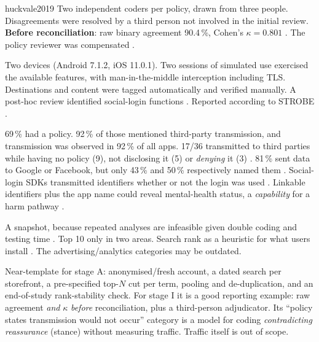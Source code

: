 \begin{papercard}{huckvale2019}
 Two independent coders per policy, drawn from three people. Disagreements were resolved by a third person not involved in the initial review. \textbf{Before reconciliation}: raw binary agreement 90.4\,\%, Cohen's $\kappa=0.801$ . The policy reviewer was compensated .

 Two devices (Android 7.1.2, iOS 11.0.1). Two sessions of simulated use exercised the available features, with man-in-the-middle interception including TLS. Destinations and content were tagged automatically and verified manually. A post-hoc review identified social-login functions . Reported according to STROBE .

 69\,\% had a policy. 92\,\% of those mentioned third-party transmission, and transmission was observed in 92\,\% of all apps. 17/36 transmitted to third parties while having no policy (9), not disclosing it (5) or \emph{denying} it (3) . 81\,\% sent data to Google or Facebook, but only 43\,\% and 50\,\% respectively named them . Social-login SDKs transmitted identifiers whether or not the login was used . Linkable identifiers plus the app name could reveal mental-health status, a \emph{capability} for a harm pathway .

 A snapshot, because repeated analyses are infeasible given double coding and testing time . Top 10 only in two areas. Search rank as a heuristic for what users install . The advertising/analytics categories may be outdated.

 Near-template for stage A: anonymised/fresh account, a dated search per storefront, a pre-specified top-$N$ cut per term, pooling and de-duplication, and an end-of-study rank-stability check. For stage I it is a good reporting example: raw agreement \emph{and} $\kappa$ \emph{before} reconciliation, plus a third-person adjudicator. Its ``policy states transmission would not occur'' category is a model for coding \emph{contradicting reassurance} (stance) without measuring traffic. Traffic itself is out of scope.
\end{papercard}
